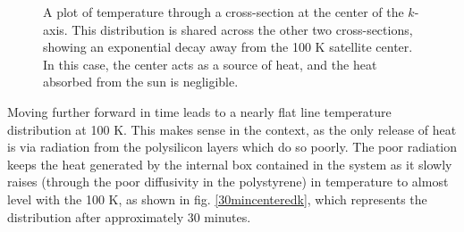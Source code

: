 \documentclass[12pt]{article}
\begin{document}
\begin{figure}[h!]
\begin{center}
\begin{subfigure}{0.6\textwidth}
\caption{\label{15mink}}
\end{subfigure}
\caption{\label{15mincenteredk}A plot of temperature through a cross-section at the center of the $k$-axis.  This distribution is shared across the other two cross-sections, showing an exponential decay away from the 100 K satellite center.  In this case, the center acts as a source of heat, and the heat absorbed from the sun is negligible.}
\end{center}
\end{figure}

Moving further forward in time leads to a nearly flat line temperature distribution at 100 K.  This makes sense in the context, as the only release of heat is via radiation from the polysilicon layers which do so poorly.  The poor radiation keeps the heat generated by the internal box contained in the system as it slowly raises (through the poor diffusivity in the polystyrene) in temperature to almost level with the 100 K, as shown in fig. \ref{30mincenteredk}, which represents the distribution after approximately 30 minutes.
\end{document}
